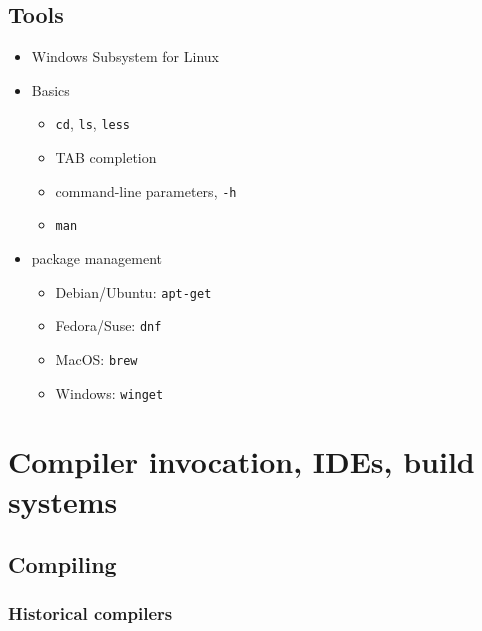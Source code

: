 \documentclass[12pt]{article}
\begin{document}
\subsection{Tools}

\begin{itemize}
    \item Windows Subsystem for Linux
    \item Basics
    \begin{itemize}
        \item \texttt{cd}, \texttt{ls}, \texttt{less}
        \item TAB completion
        \item command-line parameters, \texttt{-h}
        \item \texttt{man}
    \end{itemize}
    \item package management
    \begin{itemize}
        \item Debian/Ubuntu: \texttt{apt-get}
        \item Fedora/Suse: \texttt{dnf}
        \item MacOS: \texttt{brew}
        \item Windows: \texttt{winget}
    \end{itemize}
\end{itemize}



















\newpage
\section{Compiler invocation, IDEs, build systems}

\subsection{Compiling}

\subsubsection{Historical compilers}
\end{document}
